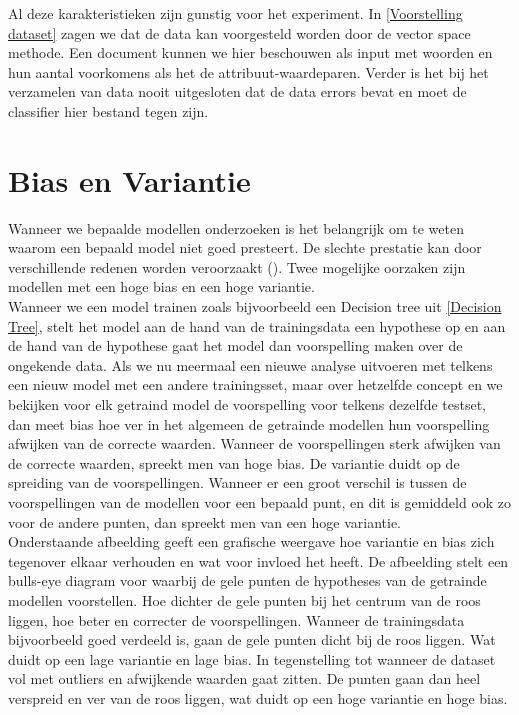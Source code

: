 Al deze karakteristieken zijn gunstig voor het experiment. In \ref{Voorstelling dataset} zagen we dat de data kan voorgesteld worden door de vector space methode. Een document kunnen we hier beschouwen als input met woorden en hun aantal voorkomens als het de attribuut-waardeparen. Verder is het bij het verzamelen van data nooit uitgesloten dat de data errors bevat en moet de classifier hier bestand tegen zijn.

\section{Bias en Variantie}\label{Bias en Variantie}

Wanneer we bepaalde modellen onderzoeken is het belangrijk om te weten waarom een bepaald model niet goed presteert. De slechte prestatie kan door verschillende redenen worden veroorzaakt (\cite{mitchell1997machine}). Twee mogelijke oorzaken zijn modellen met een hoge bias en een hoge variantie.\\
%
%
Wanneer we een model trainen zoals bijvoorbeeld een Decision tree uit \ref{Decision Tree}, stelt het model aan de hand van de trainingsdata een hypothese op en aan de hand van de hypothese gaat het model dan voorspelling maken over de ongekende data. Als we nu meermaal een nieuwe analyse uitvoeren met telkens een nieuw model met een andere trainingsset, maar over hetzelfde concept en we bekijken voor elk getraind model de voorspelling voor telkens dezelfde testset, dan meet bias hoe ver in het algemeen de getrainde modellen hun voorspelling afwijken van de correcte waarden. Wanneer de voorspellingen sterk afwijken van de correcte waarden, spreekt men van hoge bias.  De variantie duidt op de spreiding van de voorspellingen. Wanneer er een groot verschil is tussen de voorspellingen van de modellen voor een bepaald punt, en dit is gemiddeld ook zo voor de andere punten, dan spreekt men van een hoge variantie.\\
%
Onderstaande afbeelding geeft een grafische weergave hoe variantie en bias zich tegenover elkaar verhouden en wat voor invloed het heeft.
De afbeelding stelt een bulls-eye diagram voor waarbij de gele punten de hypotheses van de getrainde modellen voorstellen. Hoe dichter de gele punten bij het centrum van de roos liggen, hoe beter en correcter de voorspellingen. Wanneer de trainingsdata bijvoorbeeld goed verdeeld is, gaan de gele punten dicht bij de roos liggen. Wat duidt op een lage variantie en lage bias. In tegenstelling tot wanneer de dataset vol met outliers en afwijkende waarden gaat zitten. De punten gaan dan heel verspreid en ver van de roos liggen, wat duidt op een hoge variantie en hoge bias.\\
